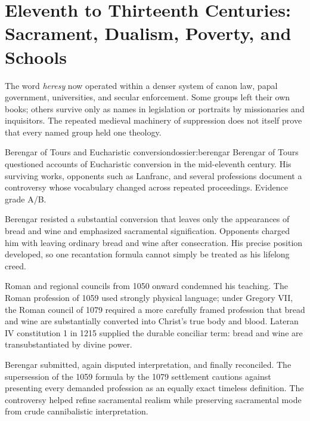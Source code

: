 \section{Eleventh to Thirteenth Centuries: Sacrament, Dualism, Poverty, and Schools}

The word \emph{heresy} now operated within a denser system of canon law, papal government, universities, and secular enforcement. Some groups left their own books; others survive only as names in legislation or portraits by missionaries and inquisitors. The repeated medieval machinery of suppression does not itself prove that every named group held one theology.

\begin{heresydossier}{Berengar of Tours and Eucharistic conversion}{dossier:berengar}
\objectfield Berengar of Tours questioned accounts of Eucharistic conversion in the mid-eleventh century. His surviving works, opponents such as Lanfranc, and several professions document a controversy whose vocabulary changed across repeated proceedings. Evidence grade A/B.

\propositionfield Berengar resisted a substantial conversion that leaves only the appearances of bread and wine and emphasized sacramental signification. Opponents charged him with leaving ordinary bread and wine after consecration. His precise position developed, so one recantation formula cannot simply be treated as his lifelong creed.

\responsefield Roman and regional councils from 1050 onward condemned his teaching. The Roman profession of 1059 used strongly physical language; under Gregory VII, the Roman council of 1079 required a more carefully framed profession that bread and wine are substantially converted into Christ's true body and blood. Lateran IV constitution 1 in 1215 supplied the durable conciliar term: bread and wine are transubstantiated by divine power.

\aftermathfield Berengar submitted, again disputed interpretation, and finally reconciled. The supersession of the 1059 formula by the 1079 settlement cautions against presenting every demanded profession as an equally exact timeless definition. The controversy helped refine sacramental realism while preserving sacramental mode from crude cannibalistic interpretation.
\end{heresydossier}


